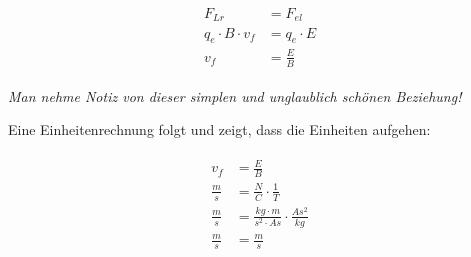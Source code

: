 \begin{align}
\begin{split}
	F_{Lr} &= F_{el} \\
	q_e \cdot B \cdot v_f &= q_e \cdot E \\
	v_f &= \frac{E}{B}
\end{split}
\end{align}

\noindent \emph{Man nehme Notiz von dieser simplen und unglaublich schönen Beziehung!}

Eine Einheitenrechnung folgt und zeigt, dass die Einheiten aufgehen:

\begin{align}
\begin{split}
	v_f &= \frac{E}{B} \\
	\frac{m}{s} &= \frac{N}{C} \cdot \frac{1}{T} \\
	\frac{m}{s} &= \frac{kg \cdot m}{s^2 \cdot As} \cdot \frac{As^2}{kg} \\
	\frac{m}{s} &= \frac{m}{s}
\end{split}
\end{align}
